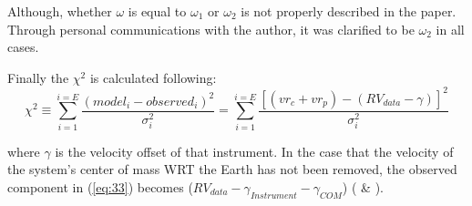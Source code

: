 \documentclass[12pt,preprint]{aastex}
\begin{document}

Although, whether $\omega$ is equal to $\omega_1$ or $\omega_2$ is not properly described in the paper.  Through personal communications with the author, it was clarified to be $\omega_2$ in all cases.  %

Finally the ${\chi}^{2} $ is calculated following:
\begin{equation}\label{eq:33}
{\chi}^{2} \equiv  \sum_{i=1}^{i=E} \frac{(model_i - observed_i)^{2}}{\sigma^{2}_i} = \sum_{i=1}^{i=E} \frac{[(vr_c+vr_p) - (RV_{data}-\gamma)]^{2}}{\sigma^{2}_i}
\end{equation}

where $\gamma $ is the velocity offset of that instrument.  In the case that the velocity of the system's center of mass WRT the Earth has not been removed, the observed component in (\ref{eq:33}) becomes ($RV_{data}-\gamma_{Instrument}-\gamma_{COM}$) (\citet{Paddock} \& \citet{Shulze-Hartung}).

\pagebreak

\clearpage
\end{document}
